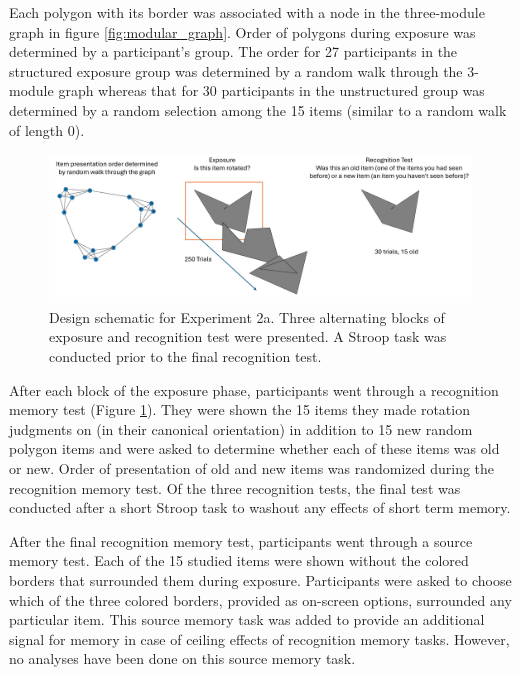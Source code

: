 Each polygon with its border was associated with a node in the three-module graph in figure \ref{fig:modular_graph}. Order of polygons during exposure was determined by a participant's group. The order for 27 participants in the structured exposure group was determined by a random walk through the 3-module graph whereas that for 30 participants in the unstructured group was determined by a random selection among the 15 items (similar to a random walk of length 0). 

\begin{figure}[ht]
    \centering
    \includegraphics[width = \textwidth]{chapter_notebooks/chapter_3/figures/exp2_design.png}
    \caption{Design schematic for Experiment 2a. Three alternating blocks of exposure and recognition test were presented. A Stroop task was conducted prior to the final recognition test.}
    \label{fig:exp2-design}
\end{figure}

After each block of the exposure phase, participants went through a recognition memory test (Figure \ref{fig:exp2-design}). They were shown the 15 items they made rotation judgments on (in their canonical orientation) in addition to 15 new random polygon items and were asked to determine whether each of these items was old or new. Order of presentation of old and new items was randomized during the recognition memory test. Of the three recognition tests, the final test was conducted after a short Stroop task to washout any effects of short term memory. 

After the final recognition memory test, participants went through a source memory test. Each of the 15 studied items were shown without the colored borders that surrounded them during exposure. Participants were asked to choose which of the three colored borders, provided as on-screen options, surrounded any particular item. This source memory task was added to provide an additional signal for memory in case of ceiling effects of recognition memory tasks. However, no analyses have been done on this source memory task. 


